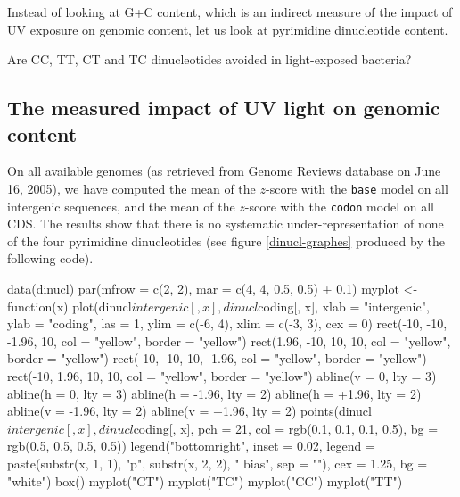 \documentclass{article}
\begin{document}
Instead of looking at G+C content, which is an indirect measure of the
impact of UV exposure on genomic content, let us look at pyrimidine
dinucleotide content.

Are CC, TT, CT and TC dinucleotides avoided in light-exposed bacteria?

\subsection{The measured impact of UV light on genomic content}

On all available genomes (as retrieved from Genome Reviews database on
June 16, 2005), we have computed the mean of the $z$-score with
the \texttt{base} model on all intergenic sequences, and the mean of
the $z$-score with the \texttt{codon} model on all CDS.
The results show that there is no systematic under-representation of
none of the four pyrimidine dinucleotides (see figure
\ref{dinucl-graphes} produced by the following code).

\begin{Schunk}
\begin{Sinput}
 data(dinucl)
 par(mfrow = c(2, 2), mar = c(4, 4, 0.5, 0.5) + 0.1)
 myplot <- function(x) {
     plot(dinucl$intergenic[, x], dinucl$coding[, x], xlab = "intergenic", 
         ylab = "coding", las = 1, ylim = c(-6, 4), xlim = c(-3, 
             3), cex = 0)
     rect(-10, -10, -1.96, 10, col = "yellow", border = "yellow")
     rect(1.96, -10, 10, 10, col = "yellow", border = "yellow")
     rect(-10, -10, 10, -1.96, col = "yellow", border = "yellow")
     rect(-10, 1.96, 10, 10, col = "yellow", border = "yellow")
     abline(v = 0, lty = 3)
     abline(h = 0, lty = 3)
     abline(h = -1.96, lty = 2)
     abline(h = +1.96, lty = 2)
     abline(v = -1.96, lty = 2)
     abline(v = +1.96, lty = 2)
     points(dinucl$intergenic[, x], dinucl$coding[, x], pch = 21, 
         col = rgb(0.1, 0.1, 0.1, 0.5), bg = rgb(0.5, 0.5, 
             0.5, 0.5))
     legend("bottomright", inset = 0.02, legend = paste(substr(x, 
         1, 1), "p", substr(x, 2, 2), " bias", sep = ""), cex = 1.25, 
         bg = "white")
     box()
 }
 myplot("CT")
 myplot("TC")
 myplot("CC")
 myplot("TT")
\end{Sinput}
\end{Schunk}

\begin{figure}
\centering{}\end{figure}
\end{document}

